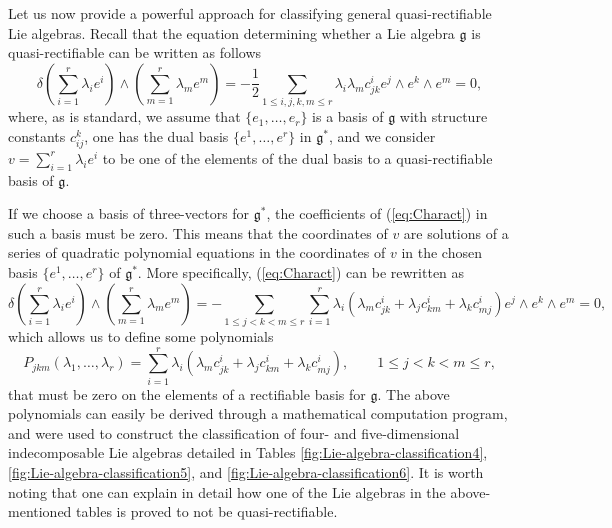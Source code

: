\documentclass[12pt]{article}
\theoremstyle{plain}
\theoremstyle{definition}
\numberwithin{equation}{section}
\begin{document}
Let us now provide a powerful approach for classifying general quasi-rectifiable Lie algebras. Recall that the equation determining whether a Lie algebra $\mathfrak{g}$ is quasi-rectifiable can be written as follows
\begin{equation}\label{eq:Charact}
\delta\left(\sum_{i=1}^r\lambda_ie^i\right)\wedge\left(\sum_{m=1}^r\lambda_me^m\right)=-\frac 12\sum_{1\leq i,j,k,m\leq r}\lambda_i\lambda_mc_{jk}^ie^j\wedge e^k\wedge e^m=0,
\end{equation}
where, as is standard, we assume that $\{e_1,\ldots,e_r\}$ is a basis of $\mathfrak{g}$ with structure constants $c_{ij}^k$, one has the dual basis $\{e^1,\ldots,e^r\}$ in $\mathfrak{g}^*$, and we consider $v=\sum_{i=1}^r\lambda_ie^i$ to be one of the elements of the dual basis to a quasi-rectifiable basis of $\mathfrak{g}$.

If we choose a basis of three-vectors for $\mathfrak{g}^*$, the coefficients of (\ref{eq:Charact}) in such a basis must be zero. This means that the coordinates of $v$ are solutions of a series of quadratic polynomial equations in the coordinates of $v$ in the chosen basis $\{e^1,\ldots,e^r\}$ of $\mathfrak{g}^*$. More specifically, (\ref{eq:Charact}) can be rewritten as 
\begin{equation*}
\delta\left(\sum_{i=1}^r\lambda_ie^i\right)\wedge\left(\sum_{m=1}^r\lambda_me^m\right)=-\sum_{1\leq j<k<m\leq r}\sum_{i=1}^r\lambda_i(\lambda_mc_{jk}^i+\lambda_jc_{km}^i+\lambda_kc_{mj}^i)e^j\wedge e^k\wedge e^m=0,
\end{equation*}
which allows us to define some polynomials
$$
P_{jkm}(\lambda_1,\ldots,\lambda_r)=\sum_{i=1}^r\lambda_i(\lambda_mc_{jk}^i+\lambda_jc_{km}^i+\lambda_kc_{mj}^i),\qquad 1\leq j<k<m\leq r,
$$
that must be zero on the elements of a rectifiable basis for $\mathfrak{g}$. The above polynomials can easily be derived through a mathematical computation program, and were used to construct the classification of four- and five-dimensional indecomposable Lie algebras detailed in Tables \ref{fig:Lie-algebra-classification4}, \ref{fig:Lie-algebra-classification5},  and \ref{fig:Lie-algebra-classification6}. It is worth noting that one can explain in detail how one of the Lie algebras in the above-mentioned tables is proved to not be quasi-rectifiable. 
\end{document}
